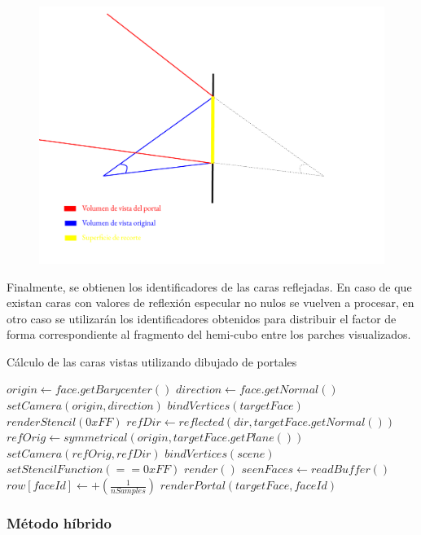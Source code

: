 \begin{figure}[H]
	\centering
	\includegraphics[width=.8\linewidth]{assets/Espejo}
	\label{img:espejo}
\end{figure}

Finalmente, se obtienen los identificadores de las caras reflejadas. En caso de que existan caras con valores de reflexión especular no nulos se vuelven a procesar, en otro caso se utilizarán los identificadores obtenidos para distribuir el factor de forma correspondiente al fragmento del hemi-cubo entre los parches visualizados.

\begin{algorithm}
	\caption{Cálculo de las caras vistas utilizando dibujado de portales}
	\label{alg:processHemicube}
	\begin{algorithmic}
		\State $origin \gets face.getBarycenter()$
		\State $direction \gets face.getNormal()$
		\State $setCamera(origin, direction)$
		\State $bindVertices(targetFace)$
		\State $renderStencil(0xFF)$
		\State $refDir \gets reflected(dir, targetFace.getNormal())$
		\State $refOrig \gets symmetrical(origin, targetFace.getPlane())$
		\State $setCamera(refOrig, refDir)$
		\State $bindVertices(scene)$
		\State $setStencilFunction(== 0xFF)$
		\State $render()$
		\State $seenFaces \gets readBuffer()$
				\State $row[faceId] \gets +(\frac{1}{nSamples})$
					\State $renderPortal(targetFace, faceId)$
				\EndIf
			\EndIf
		\EndLoop
		\EndFunction
	\end{algorithmic}
\end{algorithm}

\subsubsection{Método híbrido}

